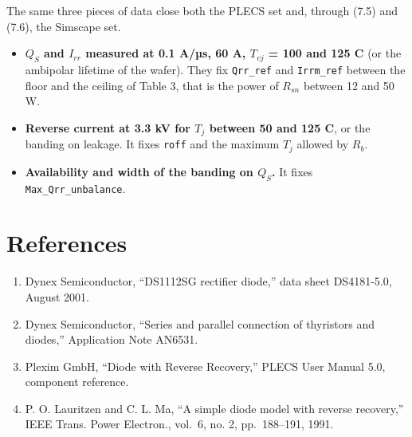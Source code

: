 \documentclass[11pt,a4paper,numbers=noenddot]{scrartcl}
\providecommand{\tightlist}{\setlength{\itemsep}{0pt}\setlength{\parskip}{0pt}}
\begin{document}
\begin{onehalfspace}
The same three pieces of data close both the PLECS set and, through (7.5) and (7.6), the Simscape set.

\begin{itemize}
\tightlist
\item
  \textbf{\(Q_S\) and \(I_{rr}\) measured at 0.1 A/µs, 60 A, \(T_{vj}\) = 100 and 125 \textdegree{}C} (or the ambipolar lifetime of the wafer). They fix \texttt{Qrr\_ref} and \texttt{Irrm\_ref} between the floor and the ceiling of Table 3, that is the power of \(R_{sn}\) between 12 and 50 W.
\item
  \textbf{Reverse current at 3.3 kV for \(T_j\) between 50 and 125 \textdegree{}C}, or the banding on leakage. It fixes \texttt{roff} and the maximum \(T_j\) allowed by \(R_b\).
\item
  \textbf{Availability and width of the banding on \(Q_S\).} It fixes \texttt{Max\_Qrr\_unbalance}.
\end{itemize}

\section*{References}\label{references}

\begin{enumerate}
\def\labelenumi{\arabic{enumi}.}
\tightlist
\item
  Dynex Semiconductor, ``DS1112SG rectifier diode,'' data sheet DS4181-5.0, August 2001.
\item
  Dynex Semiconductor, ``Series and parallel connection of thyristors and diodes,'' Application Note AN6531.
\item
  Plexim GmbH, ``Diode with Reverse Recovery,'' PLECS User Manual 5.0, component reference.
\item
  P. O. Lauritzen and C. L. Ma, ``A simple diode model with reverse recovery,'' IEEE Trans. Power Electron., vol.~6, no. 2, pp.~188--191, 1991.
\end{enumerate}

\end{onehalfspace}
\end{document}
